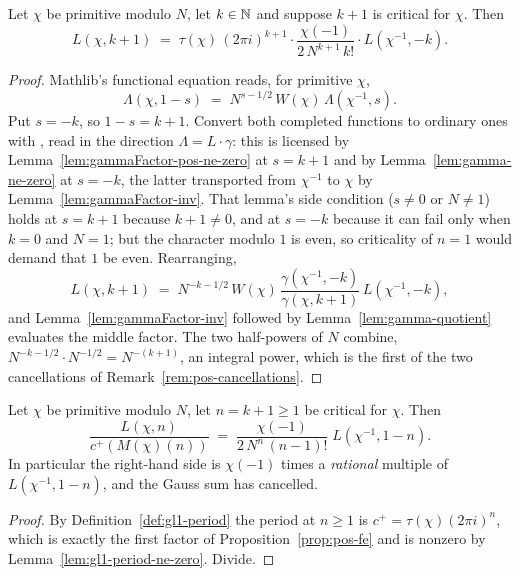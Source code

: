 \begin{proposition}
  \label{prop:pos-fe}
  \leanok
  Let $\chi$ be primitive modulo $N$, let $k \in \mathbb{N}$ and suppose $k+1$ is critical for
  $\chi$. Then
  \[ L(\chi, k+1) \;=\; \tau(\chi)\,(2\pi i)^{k+1} \cdot
       \frac{\chi(-1)}{2\,N^{k+1}\,k!} \cdot L(\chi^{-1}, -k). \]
\end{proposition}
\begin{proof}
  \leanok
  Mathlib's functional equation
   reads, for primitive
  $\chi$,
  \[ \Lambda(\chi, 1-s) \;=\; N^{s-1/2}\, W(\chi)\, \Lambda(\chi^{-1}, s). \]
  Put $s = -k$, so $1-s = k+1$. Convert both completed functions to ordinary ones with
  , read in the direction
  $\Lambda = L\cdot\gamma$: this is licensed by
  Lemma~\ref{lem:gammaFactor-pos-ne-zero} at $s = k+1$ and by Lemma~\ref{lem:gamma-ne-zero}
  at $s = -k$, the latter transported from $\chi^{-1}$ to $\chi$ by
  Lemma~\ref{lem:gammaFactor-inv}. That lemma's side condition ($s \neq 0$ or $N \neq 1$)
  holds at $s = k+1$ because $k+1 \neq 0$, and at $s = -k$ because it can fail only when
  $k = 0$ and $N = 1$; but the character modulo $1$ is even, so criticality of $n = 1$ would
  demand that $1$ be even. Rearranging,
  \[ L(\chi,k+1) \;=\; N^{-k-1/2}\, W(\chi)\,
       \frac{\gamma(\chi^{-1},-k)}{\gamma(\chi,k+1)}\, L(\chi^{-1},-k), \]
  and Lemma~\ref{lem:gammaFactor-inv} followed by Lemma~\ref{lem:gamma-quotient} evaluates the
  middle factor. The two half-powers of $N$ combine,
  $N^{-k-1/2}\cdot N^{-1/2} = N^{-(k+1)}$, an integral power, which is the first of the two
  cancellations of Remark~\ref{rem:pos-cancellations}.
\end{proof}

\begin{proposition}
  \label{prop:pos-reduction}
  \leanok
  Let $\chi$ be primitive modulo $N$, let $n = k+1 \geq 1$ be critical for $\chi$. Then
  \[ \frac{L(\chi,n)}{c^{+}(M(\chi)(n))} \;=\;
     \frac{\chi(-1)}{2\,N^{n}\,(n-1)!}\; L(\chi^{-1},1-n). \]
  In particular the right-hand side is $\chi(-1)$ times a \emph{rational} multiple of
  $L(\chi^{-1},1-n)$, and the Gauss sum has cancelled.
\end{proposition}
\begin{proof}
  \leanok
  By Definition~\ref{def:gl1-period} the period at $n \geq 1$ is
  $c^{+} = \tau(\chi)(2\pi i)^{n}$, which is exactly the first factor of
  Proposition~\ref{prop:pos-fe} and is nonzero by
  Lemma~\ref{lem:gl1-period-ne-zero}. Divide.
\end{proof}

